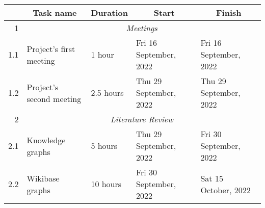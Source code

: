 \documentclass{standalone}
\begin{document}
\begin{tabular}{|r|llll|}
    \hline
    \rowcolor[HTML]{C0C0C0}
    \multicolumn{1}{|c|}{\cellcolor[HTML]{C0C0C0}\textbf{ID}} & \multicolumn{1}{c|}{\cellcolor[HTML]{C0C0C0}\textbf{Task name}} & \multicolumn{1}{c|}{\cellcolor[HTML]{C0C0C0}\textbf{Duration}} & \multicolumn{1}{c|}{\cellcolor[HTML]{C0C0C0}\textbf{Start}} & \multicolumn{1}{c|}{\cellcolor[HTML]{C0C0C0}\textbf{Finish}} \\ \hline
    1                                                         & \multicolumn{4}{c|}{\textit{Meetings}}                                                                                                                                                                                                                        \\ \hline
    1.1                                                       & \multicolumn{1}{l|}{Project's first meeting}                    & \multicolumn{1}{l|}{1 hour}                                    & \multicolumn{1}{l|}{Fri 16 September, 2022}                 & Fri 16 September, 2022                                       \\ \hline
    1.2                                                       & \multicolumn{1}{l|}{Project's second meeting}                   & \multicolumn{1}{l|}{2.5 hours}                                 & \multicolumn{1}{l|}{Thu 29 September, 2022}                 & Thu 29 September, 2022                                       \\ \hline
    2                                                         & \multicolumn{4}{c|}{\textit{Literature Review}}                                                                                                                                                                                                               \\ \hline
    2.1                                                       & \multicolumn{1}{l|}{Knowledge graphs}                           & \multicolumn{1}{l|}{5 hours}                                   & \multicolumn{1}{l|}{Thu 29 September, 2022}                 & Fri 30 September, 2022                                       \\ \hline
    2.2                                                       & \multicolumn{1}{l|}{Wikibase graphs}                            & \multicolumn{1}{l|}{10 hours}                                  & \multicolumn{1}{l|}{Fri 30 September, 2022}                 & Sat 15 October, 2022                                         \\ \hline

\end{tabular}
\end{document}
